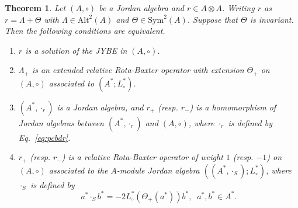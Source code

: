 \documentclass[12pt, reqno, a4paper]{amsart}
\newtheorem{theorem}{Theorem}[section]
\theoremstyle{definition}
\begin{document}
\begin{theorem}\label{thm:lreq}
	Let $(A, \circ)$ be a Jordan algebra and $r \in A \otimes A$.
	Writing $r$ as $r = \Lambda + \Theta$ with $\Lambda \in \mathrm{Alt}^2(A)$ and $\Theta \in \mathrm{Sym}^2(A)$.
	Suppose that $\Theta$ is invariant.
	Then the following conditions are equivalent.
	\begin{enumerate}[label=(\roman*)]
			\item\label{it:reqd1}
		      $r$ is a solution of the JYBE in $(A, \circ)$.
		\item\label{it:reqd2}
		      $\Lambda_{+}$ is an extended relative Rota-Baxter operator with extension $\Theta_{+}$ on $(A, \circ)$ associated to $(A^*; L_{\circ}^*)$.

		\item\label{it:reqd3}
		      $(A^*, \cdot_r)$ is a Jordan algebra, and $r_{+}$ (resp. $r_{-}$) is a homomorphism of Jordan algebras between $(A^*, \cdot_{r})$ and $(A, \circ)$, where $\cdot_{r}$ is defined by Eq.~\eqref{eq:pcbdr}.

		\item\label{it:reqd4}
		      $r_{+}$ (resp. $r_{-}$) is a relative Rota-Baxter operator of weight $1$ (resp. $-1$) on $(A, \circ)$ associated to the $A$-module Jordan algebra $((A^*, \cdot_{S}); L_{\circ}^*)$, where $\cdot_{S}$ is defined by
		      \begin{equation}
		      	a^* \cdot_{S} b^*  = - 2 L_{\circ}^*(\Theta_{+}(a^*)) b^*, \;\; a^*, b^* \in A^*. \label{eq:dmd}
		      \end{equation}

	\end{enumerate}
\end{theorem}
\end{document}
